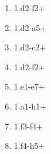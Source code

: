 \begin{enumerate}
\setcounter{enumi}{\value{d_counter}}
\item 1.\queen{}d2-f2+
\item 1.\queen{}d2-a5+
\item 1.\queen{}d2-c2+
\item 1.\queen{}d2-f2+
\item 1.\rook{}e1-e7+
\item 1.\rook{}a1-h1+

\item 1.\pawn{}f3-f4+
\item 1.\knight{}f4-h5+
\setcounter{d_counter}{\value{enumi}}
\end{enumerate}